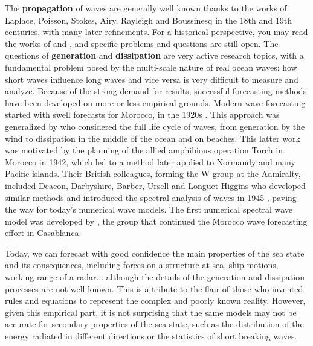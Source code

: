 The \textbf{propagation} of waves are generally well known thanks to the works of Laplace, Poisson, Stokes, Airy, Rayleigh and Boussinesq in 
the 18th and 19th centuries, with many later refinements. For a historical perspective, you may read the works of  \cite{Darrigol2003} and \cite{Craik2004}, and specific problems and questions are still open. The questions of  \textbf{generation} and \textbf{dissipation} are very active
research topics, with a fundamental problem posed by the multi-scale nature of real ocean waves: how short waves influence long waves and vice versa is 
very difficult to measure and analyze. Because of the strong demand for results, successful forecasting methods have been developed on more or less empirical grounds. 
Modern wave forecasting started with swell forecasts
for Morocco, in the 1920s \citep{Gain1918,Montagne1922}. This approach was generalized by 
\cite{Sverdrup&Munk1947} who considered the full life cycle of waves, from generation by the wind to dissipation 
in the middle of the ocean and on beaches. This latter work was 
motivated by the planning of the allied amphibious operation Torch in Morocco in 1942, which led to a method later applied to Normandy 
and many Pacific islands. Their British colleagues, forming the W group at the Admiralty, included Deacon, Darbyshire, Barber, Ursell and Longuet-Higgins  
who developed similar methods and introduced the spectral analysis of waves in 1945 \citep{Ursell1999}, paving the way for 
today's numerical wave models. The first numerical spectral wave model was developed by \cite{Gelci&al.1957}, the group that continued the Morocco wave forecasting effort in Casablanca.


Today, we can forecast with good confidence the main properties of the sea state and its consequences, including forces on a structure 
at sea, ship motions, working range of a radar... although the details of the generation and dissipation processes are not well known. 
This is a tribute to the flair of those who invented rules and equations to represent the complex and poorly known reality. 
However, given this empirical part, it is not surprising that the same models may not be accurate for secondary properties of the sea state, such as the distribution 
of the energy radiated in different directions or the statistics of short breaking waves. 


